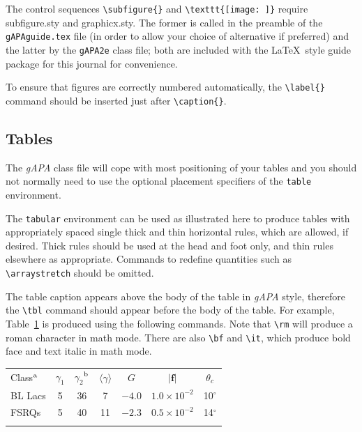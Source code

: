 \documentclass{gAPA2e}
\theoremstyle{plain}
\theoremstyle{remark}
\theoremstyle{definition}
\begin{document}
The control sequences \verb"\subfigure{}" and \verb"\texttt{[image: ]}" require subfigure.sty and graphicx.sty.
The former is called in the preamble of the \texttt{gAPAguide.tex} file (in order to allow your choice of alternative if preferred)
and the latter by the \texttt{gAPA2e} class file; both are included with the \LaTeX\ style guide package for this journal for convenience.

To ensure that figures are correctly numbered automatically, the \verb"\label{}" command should be inserted just
after \verb"\caption{}".


\subsection{Tables}

The \textit{gAPA} class file will cope with most positioning of your tables and you should not normally need to use the optional
placement specifiers of the \texttt{table} environment.

The \texttt{tabular} environment can be used as illustrated here to produce tables with appropriately spaced single thick and thin
horizontal rules, which are allowed, if desired. Thick rules should be used at the head and foot only, and thin rules elsewhere as appropriate.
Commands to redefine quantities such as \verb"\arraystretch" should be omitted.

The table caption appears above the body of the table in \textit{gAPA} style, therefore the \verb"\tbl" command should appear before the body of the table.
For example, Table~\ref{symbols} is produced using the following commands. Note that \verb"\rm" will produce a roman character in math mode.
There are also \verb"\bf" and \verb"\it", which produce bold face and text italic in math mode.

\begin{table}
{\begin{tabular}[l]{@{}lcccccc}\toprule
  Class$^{\rm a}$ & $\gamma _1$ & $\gamma _2$$^{\rm b}$
         & $\langle \gamma \rangle$
         & $G$ & $|{\bm f}|$ & $\theta _{c}$ \\
\colrule
  BL Lacs & 5 & 36 & 7 & $-4.0$ & $1.0\times 10^{-2}$ & 10$^\circ$ \\
  FSRQs & 5 & 40 & 11 & $-2.3$ & $0.5\times 10^{-2}$ & 14$^\circ$ \\
\botrule
\end{tabular}}
\label{symbols}
\end{table}
\end{document}
